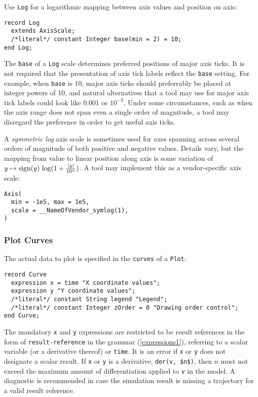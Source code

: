 Use \lstinline!Log! for a logarithmic mapping between axis values and position on axis:
\begin{lstlisting}[language=modelica]
record Log
  extends AxisScale;
  /*literal*/ constant Integer base(min = 2) = 10;
end Log;
\end{lstlisting}%

The \lstinline!base! of a \lstinline!Log! scale determines preferred positions of major axis ticks.
It is not required that the presentation of axis tick labels reflect the \lstinline!base! setting.
For example, when \lstinline!base! is 10, major axis ticks should preferrably be placed at integer powers of 10, and natural alternatives that a tool may use for major axis tick labels could look like $0.001$ or $10^{-3}$.
Under some circumstances, such as when the axis range does not span even a single order of magnitude, a tool may disregard the preference in order to get useful axis ticks.

\begin{example}
A \emph{symmetric log} axis scale is sometimes used for axes spanning across several orders of magnitude of both positive and negative values.
Details vary, but the mapping from value to linear position along axis is some variation of $y \mapsto \operatorname{sign}(y)\, \operatorname{log}(1 + \frac{\left\lvert y{} \right\rvert}{10^{\alpha}})$.
A tool may implement this as a vendor-specific axis scale:
\begin{lstlisting}[language=modelica]
Axis(
  min = -1e5, max = 1e5,
  scale = __NameOfVendor_symlog(1),
)
\end{lstlisting}
\end{example}

\subsubsection{Plot Curves}\label{plot-curves}

The actual data to plot is specified in the \lstinline!curves! of a \lstinline!Plot!:
\begin{lstlisting}[language=modelica]
record Curve
  expression x = time "X coordinate values";
  expression y "Y coordinate values";
  /*literal*/ constant String legend "Legend";
  /*literal*/ constant Integer zOrder = 0 "Drawing order control";
end Curve;
\end{lstlisting}

The mandatory \lstinline!x! and \lstinline!y! expressions are restricted to be result references in the form of \lstinline[language=grammar]!result-reference! in the grammar (\cref{expressions1}), referring to a scalar variable (or a derivative thereof) or \lstinline!time!.
It is an error if \lstinline!x! or \lstinline!y! does not designate a scalar result.
If \lstinline!x! or \lstinline!y! is a derivative, \lstinline!der(v, $n$)!, then $n$ must not exceed the maximum amount of differentiation applied to \lstinline!v! in the model.
A diagnostic is recommended in case the simulation result is missing a trajectory for a valid result reference.

